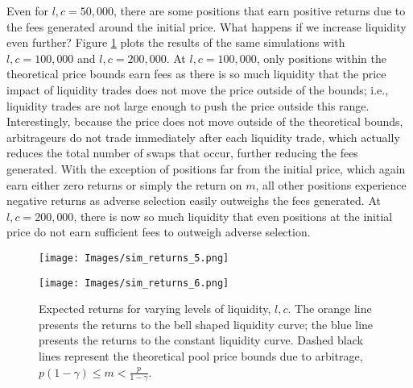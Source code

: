 \documentclass[11pt]{article}
\begin{document}
Even for $l, c = 50,000$, there are some positions that earn positive returns due to the fees generated around the initial price. What happens if we increase liquidity even further? Figure \ref{fig:sim_returns_5-6} plots the results of the same simulations with $l, c = 100,000$ and $l, c = 200,000$. At $l, c = 100,000$, only positions within the theoretical price bounds earn fees as there is so much liquidity that the price impact of liquidity trades does not move the price outside of the bounds; i.e., liquidity trades are not large enough to push the price outside this range. Interestingly, because the price does not move outside of the theoretical bounds, arbitrageurs do not trade immediately after each liquidity trade, which actually reduces the total number of swaps that occur, further reducing the fees generated. With the exception of positions far from the initial price, which again earn either zero returns or simply the return on $m$, all other positions experience negative returns as adverse selection easily outweighs the fees generated. At $l, c = 200,000$, there is now so much liquidity that even positions at the initial price do not earn sufficient fees to outweigh adverse selection.

\begin{figure}[H]
    \centering
    \begin{minipage}[b]{\textwidth}
        \texttt{[image: Images/sim\_returns\_5.png]}
    \end{minipage}
    \begin{minipage}[b]{\textwidth}
        \texttt{[image: Images/sim\_returns\_6.png]}
    \end{minipage}
    \caption{Expected returns for varying levels of liquidity, $l, c$. The orange line presents the returns to the bell shaped liquidity curve; the blue line presents the returns to the constant liquidity curve. Dashed black lines represent the theoretical pool price bounds due to arbitrage, $p (1 - \gamma) \le m < \frac{p}{1 - \gamma}$.}
    \label{fig:sim_returns_5-6}
\end{figure}
\end{document}

